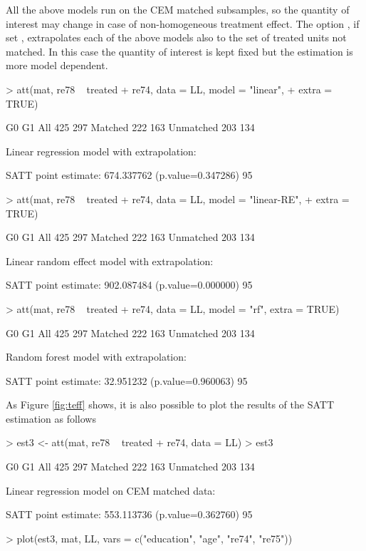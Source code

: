 \documentclass[article]{jss}
\begin{document}
All the above models run on the CEM matched subsamples, so the quantity of interest may change in case of non-homogeneous treatment effect.
The option , if set , extrapolates each of the above models also to the set of treated units not matched. In this case the quantity of interest is kept fixed but the estimation is more model dependent.
\begin{Schunk}
\begin{Sinput}
> att(mat, re78 ~ treated + re74, data = LL, model = "linear", 
+     extra = TRUE)
\end{Sinput}
\begin{Soutput}
           G0  G1
All       425 297
Matched   222 163
Unmatched 203 134

Linear regression model with extrapolation:

SATT point estimate: 674.337762 (p.value=0.347286)
95%
\end{Soutput}
\begin{Sinput}
> att(mat, re78 ~ treated + re74, data = LL, model = "linear-RE", 
+     extra = TRUE)
\end{Sinput}
\begin{Soutput}
           G0  G1
All       425 297
Matched   222 163
Unmatched 203 134

Linear random effect model with extrapolation:

SATT point estimate: 902.087484 (p.value=0.000000)
95%
\end{Soutput}
\begin{Sinput}
> att(mat, re78 ~ treated + re74, data = LL, model = "rf", extra = TRUE)
\end{Sinput}
\begin{Soutput}
           G0  G1
All       425 297
Matched   222 163
Unmatched 203 134

Random forest model with extrapolation:

SATT point estimate: 32.951232 (p.value=0.960063)
95%
\end{Soutput}
\end{Schunk}
As Figure \ref{fig:teff} shows, it is also possible to plot the results of the SATT estimation as follows
\begin{Schunk}
\begin{Sinput}
> est3 <- att(mat, re78 ~ treated + re74, data = LL)
> est3
\end{Sinput}
\begin{Soutput}
           G0  G1
All       425 297
Matched   222 163
Unmatched 203 134

Linear regression model on CEM matched data:

SATT point estimate: 553.113736 (p.value=0.362760)
95%
\end{Soutput}
\begin{Sinput}
> plot(est3, mat, LL, vars = c("education", "age", "re74", "re75"))
\end{Sinput}
\end{Schunk}
\end{document}
